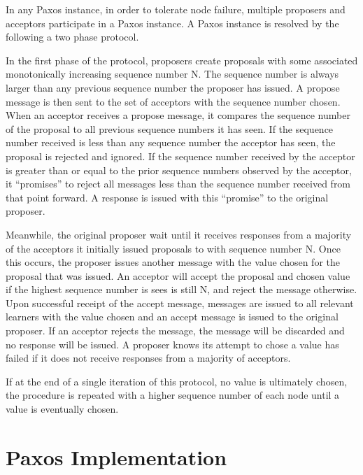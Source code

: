 \documentclass[11pt, onecolumn]{article}
\begin{document}
In any Paxos instance, in order to tolerate node failure, multiple proposers and acceptors participate in a Paxos instance.
A Paxos instance is resolved by the following a two phase protocol.

In the first phase of the protocol, proposers create proposals with some associated monotonically increasing sequence number N. 
The sequence number is always larger than any previous sequence number the proposer has issued. 
A propose message is then sent to the set of acceptors with the sequence number chosen. 
When an acceptor receives a propose message, it compares the sequence number of the proposal to all previous sequence numbers it has seen.
If the sequence number received is less than any sequence number the acceptor has seen, the proposal is rejected and ignored.
If the sequence number received by the acceptor is greater than or equal to the prior sequence numbers observed by the acceptor, it ``promises'' to reject all messages less than the sequence number received from that point forward.
A response is issued with this ``promise'' to the original proposer.

Meanwhile, the original proposer wait until it receives responses from a majority of the acceptors it initially issued proposals to with sequence number N.
Once this occurs, the proposer issues another message with the value chosen for the proposal that was issued.
An acceptor will accept the proposal and chosen value if the highest sequence number is sees is still N, and reject the message otherwise.
Upon successful receipt of the accept message, messages are issued to all relevant learners with the value chosen and an accept message is issued to the original proposer.
If an acceptor rejects the message, the message will be discarded and no response will be issued.
A proposer knows its attempt to chose a value has failed if it does not receive responses from a majority of acceptors.

If at the end of a single iteration of this protocol, no value is ultimately chosen, the procedure is repeated with a higher sequence number of each node until a value is eventually chosen.


\section{Paxos Implementation}
\end{document}
